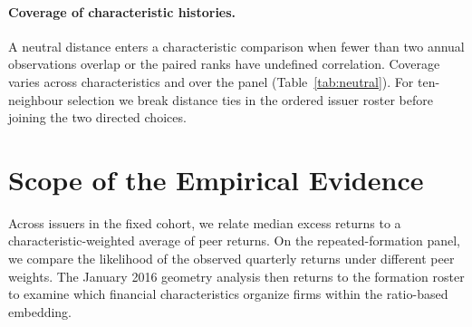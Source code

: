 \paragraph{Coverage of characteristic histories.}
A neutral distance enters a characteristic comparison when fewer than two
annual observations overlap or the paired ranks have undefined correlation.
Coverage varies across characteristics and over the panel
(Table~\ref{tab:neutral}). For ten-neighbour selection we break distance
ties in the ordered issuer roster before joining the two directed choices.

\begin{table}[t]
  \centering
  \fftabletype
  \caption{Share of issuer pairs assigned neutral distance (\%) in each
    characteristic. The pooled share counts unordered pairs within quarter
  across the matched panel.}
  \label{tab:neutral}
\end{table}

\section{Scope of the Empirical Evidence}
\label{app:scope}

Across issuers in the fixed cohort, we relate median excess returns to a
characteristic-weighted average of peer returns. On the repeated-formation
panel, we compare the likelihood of the observed quarterly returns under
different peer weights. The January 2016 geometry analysis then returns to
the formation roster to examine which financial characteristics organize
firms within the ratio-based embedding.

\begin{table}[t]
  \centering
  \fftabletype
  \caption{Market-controlled in-sample spatial-lag log-likelihood differences
    per quarter on the quarterly panel.
    All graphs use ten-neighbour weights. Ratios denote the ratio
    inputs and XBRL denotes the broad inputs. Positive values
    favour the network in the first column.
    Percentiles resample paired quarterly contributions conditional on
  fitted parameters. The last column reports Holm-adjusted $p$-values.}
  \label{tab:quarterly-comparisons}
\end{table}


